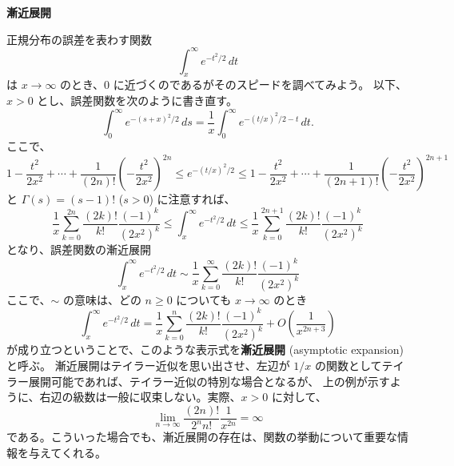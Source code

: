 \documentclass[a4paper]{jsarticle}
\theoremstyle{definition}
\theoremstyle{remark}
\begin{document}


\noindent
\textbf{漸近展開}

正規分布の誤差を表わす関数
\[
  \int_x^\infty e^{-t^2/2}\, dt
\]
は $x \to \infty$ のとき、$0$ に近づくのであるがそのスピードを調べてみよう。
以下、$x>0$ とし、誤差関数を次のように書き直す。
\[
  \int_0^\infty e^{-(s+x)^2/2}\, ds = \frac{1}{x} \int_0^\infty e^{ - (t/x)^2/2 - t}\, dt. 
\]
ここで、
\[
  1 - \frac{t^2}{2x^2} + \cdots + \frac{1}{(2n)!} \left( -\frac{t^2}{2x^2} \right)^{2n} \leq e^{-(t/x)^2/2} \leq 1 - \frac{t^2}{2x^2} + \cdots
  + \frac{1}{(2n+1)!} \left( -\frac{t^2}{2x^2} \right)^{2n+1}
\]
と $\Gamma(s) = (s-1)!$ ($s>0$) に注意すれば、
\[
  \frac{1}{x} \sum_{k=0}^{2n} \frac{(2k)!}{k!} \frac{(-1)^k}{(2x^2)^k} \leq 
  \int_x^\infty e^{-t^2/2}\, dt
  \leq \frac{1}{x} \sum_{k=0}^{2n+1} \frac{(2k)!}{k!} \frac{(-1)^k}{(2x^2)^k} 
\]
となり、誤差関数の漸近展開
\[
\int_x^\infty e^{-t^2/2}\, dt \sim  \frac{1}{x} \sum_{k=0}^{\infty} \frac{(2k)!}{k!} \frac{(-1)^k}{(2x^2)^k} 
\]
ここで、$\sim$ の意味は、どの $n \geq 0$ についても $x \to \infty$ のとき
\[
  \int_x^\infty e^{-t^2/2}\, dt =  \frac{1}{x} \sum_{k=0}^{n} \frac{(2k)!}{k!} \frac{(-1)^k}{(2x^2)^k} + O\left(\frac{1}{x^{2n+3}}\right)
\]
が成り立つということで、このような表示式を\textbf{漸近展開} (asymptotic expansion) と呼ぶ。
漸近展開はテイラー近似を思い出させ、左辺が $1/x$ の関数としてテイラー展開可能であれば、テイラー近似の特別な場合となるが、
上の例が示すように、右辺の級数は一般に収束しない。実際、$x>0$ に対して、
\[
  \lim_{n\to \infty} \frac{(2n)!}{2^n n!} \frac{1}{x^{2n}} = \infty
\]
である。こういった場合でも、漸近展開の存在は、関数の挙動について重要な情報を与えてくれる。
\end{document}
